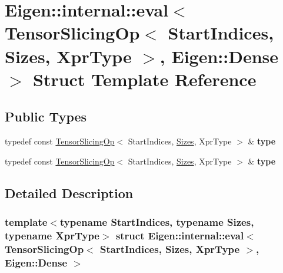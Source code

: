 \hypertarget{struct_eigen_1_1internal_1_1eval_3_01_tensor_slicing_op_3_01_start_indices_00_01_sizes_00_01_xpr0d382cdd518a43d65e8f154372eaddc8}{}\section{Eigen\+:\+:internal\+:\+:eval$<$ Tensor\+Slicing\+Op$<$ Start\+Indices, Sizes, Xpr\+Type $>$, Eigen\+:\+:Dense $>$ Struct Template Reference}
\label{struct_eigen_1_1internal_1_1eval_3_01_tensor_slicing_op_3_01_start_indices_00_01_sizes_00_01_xpr0d382cdd518a43d65e8f154372eaddc8}
\subsection*{Public Types}
\begin{DoxyCompactItemize}
\item 
\mbox{\label{struct_eigen_1_1internal_1_1eval_3_01_tensor_slicing_op_3_01_start_indices_00_01_sizes_00_01_xpr0d382cdd518a43d65e8f154372eaddc8_a2ac513609960329cef08af0a0157a3c2}} 
typedef const \hyperlink{class_eigen_1_1_tensor_slicing_op}{Tensor\+Slicing\+Op}$<$ Start\+Indices, \hyperlink{struct_eigen_1_1_sizes}{Sizes}, Xpr\+Type $>$ \& {\bfseries type}
\item 
\mbox{\label{struct_eigen_1_1internal_1_1eval_3_01_tensor_slicing_op_3_01_start_indices_00_01_sizes_00_01_xpr0d382cdd518a43d65e8f154372eaddc8_a2ac513609960329cef08af0a0157a3c2}} 
typedef const \hyperlink{class_eigen_1_1_tensor_slicing_op}{Tensor\+Slicing\+Op}$<$ Start\+Indices, \hyperlink{struct_eigen_1_1_sizes}{Sizes}, Xpr\+Type $>$ \& {\bfseries type}
\end{DoxyCompactItemize}


\subsection{Detailed Description}
\subsubsection*{template$<$typename Start\+Indices, typename Sizes, typename Xpr\+Type$>$\newline
struct Eigen\+::internal\+::eval$<$ Tensor\+Slicing\+Op$<$ Start\+Indices, Sizes, Xpr\+Type $>$, Eigen\+::\+Dense $>$}



